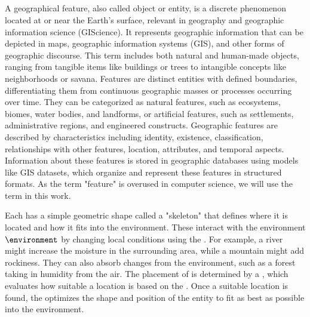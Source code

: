 \subsection{}
\label{sec:semantic-representation_environmental-objects}
A geographical feature, also called object or entity, is a discrete phenomenon located at or near the Earth's surface, relevant in geography and geographic information science (GIScience). It represents geographic information that can be depicted in maps, geographic information systems (GIS), and other forms of geographic discourse. This term includes both natural and human-made objects, ranging from tangible items like buildings or trees to intangible concepts like neighborhoods or savana. Features are distinct entities with defined boundaries, differentiating them from continuous geographic masses or processes occurring over time. They can be categorized as natural features, such as ecosystems, biomes, water bodies, and landforms, or artificial features, such as settlements, administrative regions, and engineered constructs. Geographic features are described by characteristics including identity, existence, classification, relationships with other features, location, attributes, and temporal aspects. Information about these features is stored in geographic databases using models like GIS datasets, which organize and represent these features in structured formats. As the term "feature" is overused in computer science, we will use the term  in this work.

Each  has a simple geometric shape called a "skeleton" that defines where it is located and how it fits into the environment.
These  interact with the environment $\environment$ by changing local conditions using the . For example, a river might increase the moisture in the surrounding area, while a mountain might add rockiness. They can also absorb changes from the environment, such as a forest taking in humidity from the air.
The placement of  is determined by a , which evaluates how suitable a location is based on the . Once a suitable location is found, the  optimizes the shape and position of the entity to fit as best as possible into the environment.

